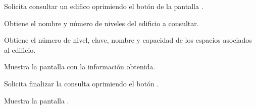 \begin{UCtrayectoria}
	\UCpaso [\UCactor] Solicita consultar un edifico oprimiendo el botón  de la pantalla . 
	
	\UCpaso [\UCsist] Obtiene el nombre y número de niveles del edificio a consultar.
	
	\UCpaso [\UCsist] Obtiene el número de nivel, clave, nombre y capacidad de los espacios asociados al edificio.
	
	\UCpaso [\UCsist] Muestra la pantalla  con la información obtenida.
	
	\UCpaso [\UCactor] Solicita finalizar la consulta oprimiendo el botón . 
	
	\UCpaso [\UCsist] Muestra la pantalla .
	
\end{UCtrayectoria}


